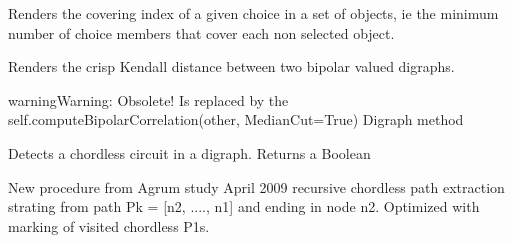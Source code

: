 \documentclass[letterpaper,10pt,english]{sphinxmanual}
\begin{document}
\begin{fulllineitems}

\begin{fulllineitems}
\label{techDoc:digraphs.Digraph.coveringIndex}
Renders the covering index of a given choice in a set of objects,
ie the minimum number of choice members that cover each
non selected object.

\end{fulllineitems}


\begin{fulllineitems}
\label{techDoc:digraphs.Digraph.crispKDistance}
Renders the crisp Kendall distance between two bipolar valued
digraphs.

\begin{notice}{warning}{Warning:}
Obsolete! Is replaced by the self.computeBipolarCorrelation(other, MedianCut=True) Digraph method
\end{notice}

\end{fulllineitems}


\begin{fulllineitems}
\label{techDoc:digraphs.Digraph.detectChordlessCircuits}
Detects a chordless circuit in a digraph.
Returns a Boolean

\end{fulllineitems}


\begin{fulllineitems}
\label{techDoc:digraphs.Digraph.detectChordlessPath}
New procedure from Agrum study April 2009
recursive chordless path extraction strating from path
Pk = {[}n2, ...., n1{]} and ending in node n2.
Optimized with marking of visited chordless P1s.

\end{fulllineitems}



\end{fulllineitems}
\end{document}
